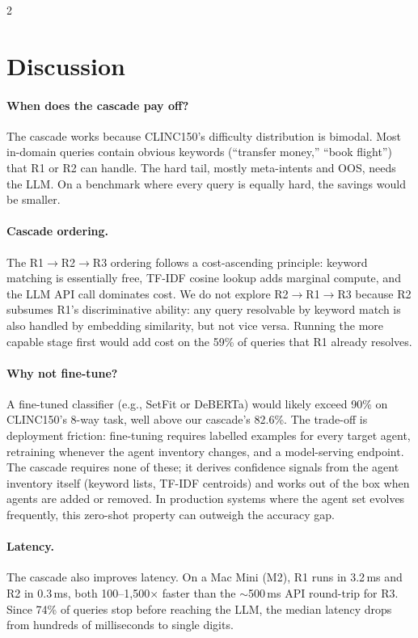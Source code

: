 \documentclass[11pt,a4paper]{article}
\begin{document}
\begin{multicols}{2}

\section{Discussion}

\paragraph{When does the cascade pay off?}
The cascade works because CLINC150's difficulty distribution is bimodal. Most in-domain queries contain obvious keywords (``transfer money,'' ``book flight'') that R1 or R2 can handle. The hard tail, mostly meta-intents and OOS, needs the LLM. On a benchmark where every query is equally hard, the savings would be smaller.

\paragraph{Cascade ordering.}
The R1$\to$R2$\to$R3 ordering follows a cost-ascending principle: keyword matching is essentially free, TF-IDF cosine lookup adds marginal compute, and the LLM API call dominates cost. We do not explore R2$\to$R1$\to$R3 because R2 subsumes R1's discriminative ability: any query resolvable by keyword match is also handled by embedding similarity, but not vice versa. Running the more capable stage first would add cost on the 59\% of queries that R1 already resolves.

\paragraph{Why not fine-tune?}
A fine-tuned classifier (e.g., SetFit or DeBERTa) would likely exceed 90\% on CLINC150's 8-way task, well above our cascade's 82.6\%. The trade-off is deployment friction: fine-tuning requires labelled examples for every target agent, retraining whenever the agent inventory changes, and a model-serving endpoint. The cascade requires none of these; it derives confidence signals from the agent inventory itself (keyword lists, TF-IDF centroids) and works out of the box when agents are added or removed. In production systems where the agent set evolves frequently, this zero-shot property can outweigh the accuracy gap.

\paragraph{Latency.}
The cascade also improves latency. On a Mac Mini (M2), R1 runs in 3.2\,ms and R2 in 0.3\,ms, both 100--1,500$\times$ faster than the $\sim$500\,ms API round-trip for R3. Since 74\% of queries stop before reaching the LLM, the median latency drops from hundreds of milliseconds to single digits.


\end{multicols}
\end{document}

